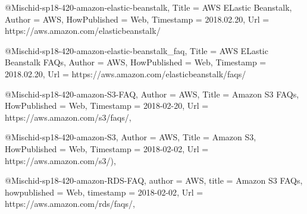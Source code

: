 
@Misc{hid-sp18-420-amazon-elastic-beanstalk,
  Title                    = {AWS ELastic Beanstalk},
  Author                   = {AWS},
  HowPublished             = {Web},
  Timestamp                = {2018.02.20},
  Url                      = {https://aws.amazon.com/elasticbeanstalk/}
}

@Misc{hid-sp18-420-amazon-elastic-beanstalk_faq,
  Title                    = {AWS ELastic Beanstalk FAQs},
  Author                   = {AWS},
  HowPublished             = {Web},
  Timestamp                = {2018.02.20},
  Url                      = { https://aws.amazon.com/elasticbeanstalk/faqs/}
}

@Misc{hid-sp18-420-amazon-S3-FAQ,
Author                     = {AWS},
Title                      = {Amazon S3 FAQs},
HowPublished               = {Web},
Timestamp                  = {2018-02-20},
Url                        = {https://aws.amazon.com/s3/faqs/},
}

@Misc{hid-sp18-420-amazon-S3,
Author                    = {AWS},
Title                     = {Amazon S3},
HowPublished              = {Web},
Timestamp                 = {2018-02-02},
Url                       = {https://aws.amazon.com/s3/)},
}

@Misc{hid-sp18-420-amazon-RDS-FAQ,
  author  = {AWS},
  title        = {Amazon S3 FAQs},
  howpublished = {Web},
  timestamp    = {2018-02-02},
  Url = {https://aws.amazon.com/rds/faqs/},
}
